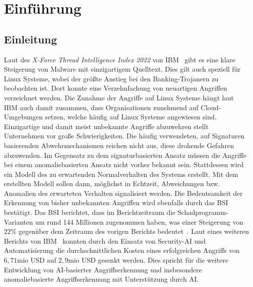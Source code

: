 \chapter{Einführung}\label{ch:introduction} %
\section{Einleitung}\label{sec:einleitung}
Laut des \textit{X-Force Thread Intelligence Index 2022} von IBM~\cite{IBM} gibt es eine klare Steigerung von Malware mit einzigartigem Quelltext.
Dies gilt auch speziell für Linux Systeme, wobei der größte Anstieg bei den Banking-Trojanern zu beobachten ist.
Dort konnte eine Verzehnfachung von neuartigen Angriffen verzeichnet werden.
Die Zunahme der Angriffe auf Linux Systeme hängt laut IBM auch damit zusammen, dass Organisationen zunehmend auf Cloud-Umgebungen setzen, welche häufig auf Linux Systeme angewiesen sind.
Einzigartige und damit meist unbekannte Angriffe abzuwehren stellt Unternehmen vor große Schwierigkeiten.
Die häufig verwendeten, auf Signaturen basierenden Abwehrmechanismen reichen nicht aus, diese drohende Gefahren abzuwenden.
Im Gegensatz zu dem signaturbasierten Ansatz müssen die Angriffe bei einem anomaliebasierten Ansatz nicht vorher bekannt sein.
Stattdessen wird ein Modell des zu erwartenden Normalverhalten des Systems erstellt.
Mit dem erstellten Modell sollen dann, möglichst in Echtzeit, Abweichungen bzw. Anomalien des erwarteten Verhalten signalisiert werden.
Die Bedeutsamkeit der Erkennung von bisher unbekannten Angriffen wird ebenfalls durch das \ac{BSI} bestätigt.
Das \ac{BSI} berichtet, dass im Berichtzeitraum die Schadprogramm-Varianten um rund 144 Millionen zugenommen haben, was einer Steigerung von 22\% gegenüber dem Zeitraum des vorigen Berichts bedeutet~\cite{BSI}.
Laut eines weiteren Berichts von IBM~\cite{IBM2} konnten durch den Einsatz von Security-\ac{AI} und Automatisierung die durchschnittlichen Kosten eines erfolgreichen Angriffs von $6,71$mio USD auf $2,9$mio USD gesenkt werden.
Dies spricht für die weitere Entwicklung von \ac{AI}-basierter Angriffserkennung und insbesondere anomaliebasierte Angriffserkennung mit Unterstützung durch \ac{AI}.

